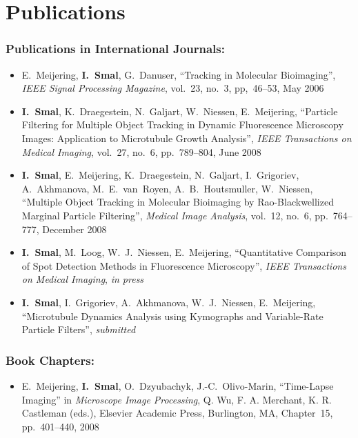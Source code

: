 %
%

\noquote
\orgchpos
\chapter*{Publications}
\label{publications}

\small
\normalsize

\subsection*{Publications in International Journals:}
\vspace{1ex}
\begin{itemize}
\item E.~Meijering, \textbf{I.~Smal}, G.~Danuser, ``Tracking in Molecular
  Bioimaging'', \emph{IEEE Signal Processing Magazine},
  vol.~23, no.~3, pp,~46--53, May 2006

\item \textbf{I.~Smal}, K.~Draegestein, N.~Galjart, W.~Niessen, E.~Meijering,
  ``Particle Filtering for Multiple Object Tracking in Dynamic 
Fluorescence Microscopy Images: Application to Microtubule Growth
Analysis'', \emph{IEEE Transactions on Medical Imaging}, vol.~27, no.~6, pp.~789--804, June 2008

\item \textbf{I.~Smal}, E.~Meijering, K.~Draegestein, N.~Galjart, I.~Grigoriev,
  A.~Akhmanova, M.~E.~van~Royen, A.~B.~Houtsmuller, W.~Niessen, 
``Multiple Object Tracking in Molecular Bioimaging by
Rao-Blackwellized Marginal Particle Filtering'',
\emph{Medical Image Analysis}, vol.~12, no.~6, pp.~764--777, December
2008

\item \textbf{I.~Smal}, M.~Loog,  W.~J.~Niessen, E.~Meijering,
``Quantitative Comparison of Spot Detection Methods in Fluorescence
Microscopy'', \emph{IEEE Transactions on Medical Imaging},  \emph{in press}

\item \textbf{I.~Smal}, I.~Grigoriev, A.~Akhmanova, W.~J.~Niessen, E.~Meijering,
``Microtubule Dynamics Analysis using Kymographs and Variable-Rate Particle
  Filters'', \emph{submitted}
\end{itemize}

\subsection*{Book Chapters:}
\vspace{1ex}
\begin{itemize}
\item E.~Meijering, \textbf{I.~Smal}, O.~Dzyubachyk, J.-C.~Olivo-Marin,
  ``Time-Lapse Imaging'' in \emph{Microscope Image Processing}, Q. Wu,
  F. A. Merchant, K. R. Castleman (eds.), Elsevier Academic Press,
  Burlington, MA, Chapter~15, pp.~401--440, 2008
\end{itemize}


